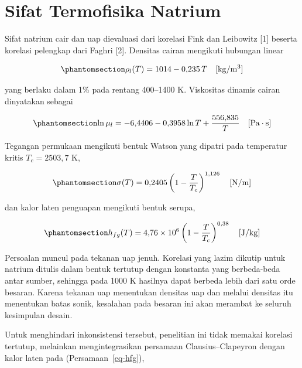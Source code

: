 \documentclass[
  indonesian,
  12pt,
  a4paper,
]{report}
\begin{document}
\section{Sifat Termofisika Natrium}\label{sifat-termofisika-natrium}

Sifat natrium cair dan uap dievaluasi dari korelasi Fink dan Leibowitz
{[}1{]} beserta korelasi pelengkap dari Faghri {[}2{]}. Densitas cairan
mengikuti hubungan linear

\begin{equation}\protect\phantomsection\label{eq-rhol}{\rho_l(T) = 1014 - 0{,}235\,T \quad [\mathrm{kg/m^3}]}\end{equation}

yang berlaku dalam 1\% pada rentang 400--1400 K. Viskositas dinamis
cairan dinyatakan sebagai

\begin{equation}\protect\phantomsection\label{eq-mul}{\ln \mu_l = -6{,}4406 - 0{,}3958 \ln T + \frac{556{,}835}{T} \quad [\mathrm{Pa\cdot s}]}\end{equation}

Tegangan permukaan mengikuti bentuk Watson yang dipatri pada temperatur
kritis \(T_c = 2503{,}7\) K,

\begin{equation}\protect\phantomsection\label{eq-sigma}{\sigma(T) = 0{,}2405 \left(1 - \frac{T}{T_c}\right)^{1{,}126} \quad [\mathrm{N/m}]}\end{equation}

dan kalor laten penguapan mengikuti bentuk serupa,

\begin{equation}\protect\phantomsection\label{eq-hfg}{h_{fg}(T) = 4{,}76 \times 10^{6} \left(1 - \frac{T}{T_c}\right)^{0{,}38} \quad [\mathrm{J/kg}]}\end{equation}

Persoalan muncul pada tekanan uap jenuh. Korelasi yang lazim dikutip
untuk natrium ditulis dalam bentuk tertutup dengan konstanta yang
berbeda-beda antar sumber, sehingga pada 1000 K hasilnya dapat berbeda
lebih dari satu orde besaran. Karena tekanan uap menentukan densitas uap
dan melalui densitas itu menentukan batas sonik, kesalahan pada besaran
ini akan merambat ke seluruh kesimpulan desain.

Untuk menghindari inkonsistensi tersebut, penelitian ini tidak memakai
korelasi tertutup, melainkan mengintegrasikan persamaan
Clausius--Clapeyron dengan kalor laten pada (Persamaan~\ref{eq-hfg}),
\end{document}
